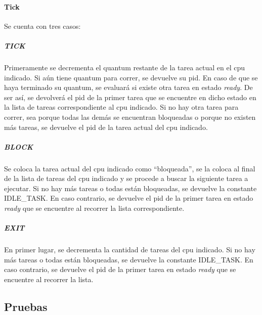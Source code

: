 \paragraph{Tick} Se cuenta con tres casos:

\subparagraph{TICK} Primeramente se decrementa el quantum restante de la tarea actual en el cpu indicado.  Si aún tiene quantum para correr, se devuelve su pid.  En caso de que se haya terminado su quantum, se evaluará si existe otra tarea en estado {\it ready}.  De ser así, se devolverá el pid de la primer tarea que se encuentre en dicho estado en la lista de tareas correspondiente al cpu indicado.  Si no hay otra tarea para correr, sea porque todas las demás se encuentran bloqueadas o porque no existen más tareas, se devuelve el pid de la tarea actual del cpu indicado.
\subparagraph{BLOCK} Se coloca la tarea actual del cpu indicado como ``bloqueada'', se la coloca al final de la lista de tareas del cpu indicado y se procede a buscar la siguiente tarea a ejecutar.  Si no hay más tareas o todas están bloqueadas, se devuelve la constante IDLE_TASK.  En caso contrario, se devuelve el pid de la primer tarea en estado {\it ready} que se encuentre al recorrer la lista correspondiente.
\subparagraph{EXIT} En primer lugar, se decrementa la cantidad de tareas del cpu indicado. Si no hay más tareas o todas están bloqueadas, se devuelve la constante IDLE_TASK.  En caso contrario, se devuelve el pid de la primer tarea en estado {\it ready} que se encuentre al recorrer la lista.

\subsection{Pruebas}
